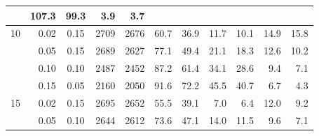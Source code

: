 \begin{table}[!htb]
\begin{tabular}{r r c r r r r r r r r}
                                     & 107.3                               & 99.3                             & 3.9  & 3.7  \\
    \midrule
    10                               & 0.02                                &
    0.15                             & 2709                                &
    2676                             & 60.7                                & 36.9
                                     & 11.7                                & 10.1                             & 14.9 & 15.8 \\
                                     & 0.05                                &
    0.15                             & 2689                                &
    2627                             & 77.1                                & 49.4
                                     & 21.1                                & 18.3                             & 12.6 & 10.2 \\
                                     & 0.10                                &
    0.10                             & 2487                                &
    2452                             & 87.2                                & 61.4
                                     & 34.1                                & 28.6                             & 9.4  & 7.1  \\
                                     & 0.15                                &
    0.05                             & 2160                                &
    2050                             & 91.6                                & 72.2
                                     & 45.5                                & 40.7                             & 6.7  & 4.3  \\
    \midrule
    15                               & 0.02                                &
    0.15                             & 2695                                &
    2652                             & 55.5                                & 39.1
                                     & 7.0                                 & 6.4                              & 12.0 & 9.2  \\
                                     & 0.05                                &
    0.10                             & 2644                                &
    2612                             & 73.6                                & 47.1
                                     & 14.0                                & 11.5                             & 9.6  & 7.1  \\

\end{tabular}
\end{table}
